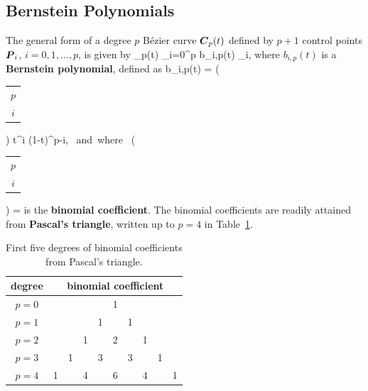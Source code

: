 \subsection{Bernstein Polynomials}
The general form of a degree $p$ B\'ezier curve $\mbox{\boldmath $C$}_p(t)$ defined by 
$p + 1$ control points $\mbox{\boldmath $P$}_i$, $i=0, 1, \ldots,p$, is given by
\be
\vC_p(t)  \sum_{i=0}^p b_{i,p}(t) \vP_i,
\label{eq:general_bezier_curve}
\ee
where
$b_{i,p}(t)$ is a {\bf Bernstein polynomial}, defined as
\be
b_{i,p}(t) = 
\left(
\begin{tabular}{c}
$p$ \\ 
$i$
\end{tabular}
\right) 
t^i (1-t)^{p-i}, \;\;\mbox{ and where } \;\;
\left(
\begin{tabular}{c}
$p$ \\ 
$i$
\end{tabular}
\right)
= \dst{}
\ee
is the {\bf binomial coefficient}.
The binomial coefficients are readily 
attained from {\bf Pascal's triangle}, written up to $p=4$ in
Table~\ref{tab:pascal}.

\begin{table}[htb]
\caption{First five degrees of binomial coefficients from Pascal's triangle.}
\begin{center}
\begin{tabular}{c|ccccccccc}
{\bf degree} & \multicolumn{9}{c}{\bf binomial coefficient} \\
\hline \hline
$p=0$ & & & & & 1 & & & & \\
$p=1$ & & & & 1 &  & 1 & & & \\
$p=2$ & & & 1 & & 2 & & 1 & & \\
$p=3$ & & 1 & & 3 & & 3 & & 1 & \\
$p=4$ & 1 & & 4 & & 6 & & 4 & & 1
\end{tabular}
\end{center}
\label{tab:pascal}
\end{table}

